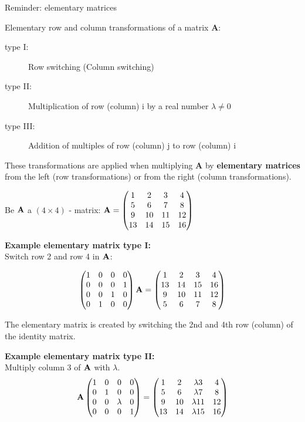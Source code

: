 \documentclass[11pt,compress,t,notes=noshow, xcolor=table]{beamer}
\begin{document}
\begin{vbframe}{Reminder: elementary matrices}

Elementary row and column transformations of a matrix $\bm{A}$:

\begin{description}
\item[type I:] Row switching (Column switching)
\item[type II:] Multiplication of row (column) i by a real number $\lambda \not= 0$
\item[type III:] Addition of multiples of row (column) j to row (column) i
\end{description}

These transformations are applied when multiplying $\bm{A}$ by \textbf{elementary matrices}
from the left (row transformations) or from the right (column transformations).

\framebreak

Be $\mathbf{A}$ a $(4 \times 4)$ - matrix:
$\mathbf{A} = \begin{pmatrix} 1 & 2 & 3 & 4 \\ 5 & 6 & 7 & 8 \\ 9 & 10 & 11 & 12 \\ 13 & 14 & 15 & 16 \end{pmatrix}$


\lz

\textbf{Example elementary matrix type I:}\\
Switch row 2 and row 4 in $\mathbf{A}$:

$$
\begin{pmatrix}  1 & 0 & 0 & 0 \\
      0 & 0 & 0 & 1 \\
      0 & 0 & 1 & 0 \\
      0 & 1 & 0 & 0  \end{pmatrix}
\mathbf{A}
= \begin{pmatrix} 1 & 2 & 3 & 4 \\ 13 & 14 & 15 & 16 \\ 9 & 10 & 11 & 12 \\ 5 & 6 & 7 & 8 \end{pmatrix}
$$
\vspace*{0.2cm}

The elementary matrix is created by switching the 2nd and 4th row (column) of the identity matrix.

\framebreak

\textbf{Example elementary matrix type II:}\\
Multiply column 3 of $\mathbf{A}$ with $\lambda$.
$$
\mathbf{A}
\begin{pmatrix}  1 & 0 & 0 & 0 \\
      0 & 1 & 0 & 0 \\
      0 & 0 & \lambda & 0 \\
      0 & 0 & 0 & 1  \end{pmatrix}
= \begin{pmatrix} 1 & 2 & \lambda 3 & 4 \\ 5 & 6 & \lambda 7 & 8 \\
       9 & 10 & \lambda 11 & 12 \\ 13 & 14 & \lambda 15 & 16 \end{pmatrix}
$$


\end{vbframe}
\end{document}

